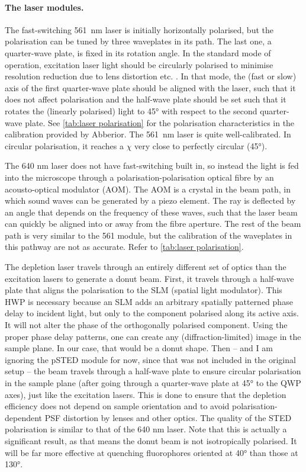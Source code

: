 \paragraph{The laser modules.} The fast-switching 561~nm laser is initially horizontally polarised, but the polarisation can be tuned by three waveplates in its path. The last one, a quarter-wave plate, is fixed in its rotation angle. In the standard mode of operation, excitation laser light should be circularly polarised to minimise resolution reduction due to lens distortion etc. \cite{Harke2008}. In that mode, the (fast or slow) axis of the first quarter-wave plate should be aligned with the laser, such that it does not affect polarisation and the half-wave plate should be set such that it rotates the (linearly polarised) light to \ang{45} with respect to the second quarter-wave plate. See \autoref{tab:laser polarisation} for the polarisation characteristics in the calibration provided by Abberior. The 561~nm laser is quite well-calibrated. In circular polarisation, it reaches a $ \chi $ very close to perfectly circular (\ang{45}).

The 640 nm laser does not have fast-switching built in, so instead the light is fed into the microscope through a polarisation-polarisation optical fibre by an acousto-optical modulator (AOM). The AOM is a crystal in the beam path, in which sound waves can be generated by a piezo element. The ray is deflected by an angle that depends on the frequency of these waves, such that the laser beam can quickly be aligned into or away from the fibre aperture. The rest of the beam path is very similar to the 561 module, but the calibration of the waveplates in this pathway are not as accurate. Refer to \autoref{tab:laser polarisation}. 

The depletion laser travels through an entirely different set of optics than the excitation lasers to generate a donut beam. First, it travels through a half-wave plate that aligns the polarisation to the SLM (spatial light modulator). This HWP is necessary because an SLM adds an arbitrary spatially patterned phase delay to incident light, but only to the component polarised along its active axis. It will not alter the phase of the orthogonally polarised component. Using the proper phase delay patterns, one can create any (diffraction-limited) image in the sample plane. In our case, that would be a donut shape. Then -- and I am ignoring the pSTED module for now, since that was not included in the original setup -- the beam travels through a half-wave plate to ensure circular polarisation in the sample plane (after going through a quarter-wave plate at \ang{45} to the QWP axes), just like the excitation lasers. This is done to ensure that the depletion efficiency does not depend on sample orientation and to avoid polarisation-dependent PSF distortion by lenses and other optics. The quality of the STED polarisation is similar to that of the 640 nm laser. Note that this is actually a significant result, as that means the donut beam is not isotropically polarised. It will be far more effective at quenching fluorophores oriented at \ang{40} than those at \ang{130}.

